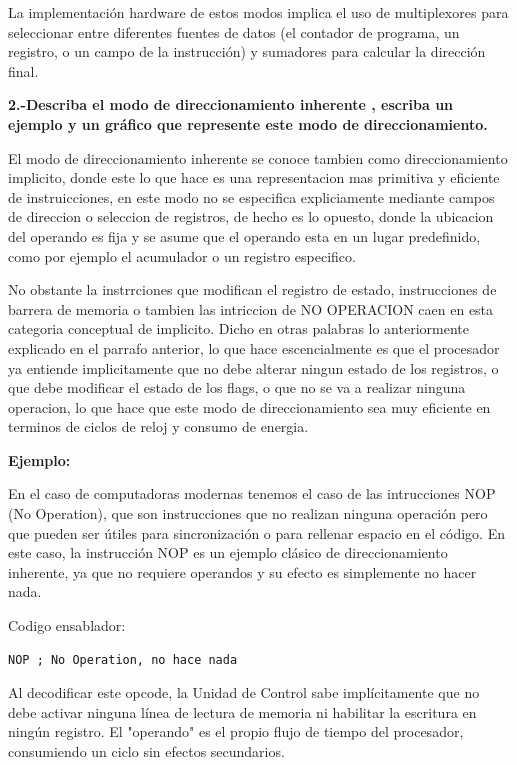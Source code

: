 \documentclass[letterpaper,12pt]{article}
\begin{document}
    La implementación hardware de estos modos implica el uso de multiplexores para seleccionar entre diferentes fuentes de datos (el contador de programa, un registro, o un campo de la instrucción) y sumadores para calcular la dirección final.

    \noindent\textbf{2.-Describa el modo de direccionamiento inherente , escriba un ejemplo y un gráfico que represente este modo de direccionamiento.}

    El modo de direccionamiento inherente se conoce tambien como direccionamiento implicito, donde este lo que hace es una representacion mas primitiva y eficiente de instruicciones, en este modo no se especifica expliciamente mediante campos de direccion o seleccion de registros, de hecho es lo opuesto, donde la ubicacion del operando es fija y se asume que el operando esta en un lugar predefinido, como por ejemplo el acumulador o un registro especifico.

    No obstante la instrrciones que modifican el registro de estado, instrucciones de barrera de memoria o tambien las intriccion de NO OPERACION caen en esta categoria conceptual de implicito. Dicho en otras palabras lo anteriormente explicado en el parrafo anterior, lo que hace escencialmente es que el procesador ya entiende implicitamente que no debe alterar ningun estado de los registros, o que debe modificar el estado de los flags, o que no se va a realizar ninguna operacion, lo que hace que este modo de direccionamiento sea muy eficiente en terminos de ciclos de reloj y consumo de energia.

    \textbf{Ejemplo:}

    En el caso de computadoras modernas tenemos el caso de las intrucciones NOP (No Operation), que son instrucciones que no realizan ninguna operación pero que pueden ser útiles para sincronización o para rellenar espacio en el código. En este caso, la instrucción NOP es un ejemplo clásico de direccionamiento inherente, ya que no requiere operandos y su efecto es simplemente no hacer nada.

    Codigo ensablador:
    \begin{lstlisting}[language={[x86masm]Assembler}, caption={Ejemplo de direccionamiento inherente con NOP}]
    NOP ; No Operation, no hace nada
    \end{lstlisting}

    Al decodificar este opcode, la Unidad de Control sabe implícitamente que no debe activar ninguna línea de lectura de memoria ni habilitar la escritura en ningún registro. El "operando" es el propio flujo de tiempo del procesador, consumiendo un ciclo sin efectos secundarios.
\end{document}
